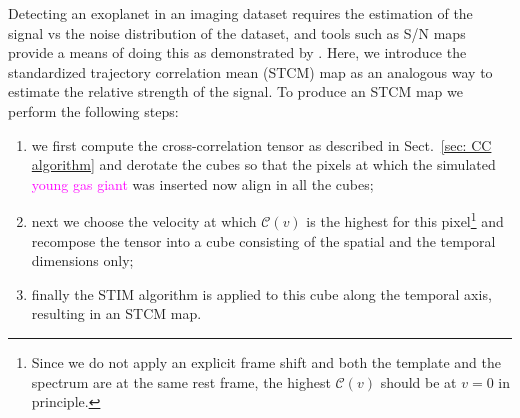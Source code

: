 \documentclass[referee]{aa} %
\newcommand{\newchange}[1]{\textcolor{magenta}{#1}}
\begin{document}
Detecting an exoplanet in an imaging dataset requires the estimation of the signal vs the noise distribution of the dataset, and tools such as S/N maps provide a means of doing this as demonstrated by \citet{2014MawetSNR}.
Here, we introduce the standardized trajectory correlation mean (STCM) map as an analogous way to estimate the relative strength of the signal. To produce an STCM map we perform the following steps:
\begin{enumerate}
    \item we first compute the cross-correlation tensor as described in Sect.~\ref{sec: CC algorithm} and derotate the cubes so that the pixels at which the simulated \newchange{young gas giant} was inserted now align in all the cubes;
    \item next we choose the velocity at which $\mathcal{C}(v)$ is the highest for this pixel\footnote{Since we do not apply an explicit frame shift and both the template and the spectrum are at the same rest frame, the highest $\mathcal{C}(v)$ should be at $v=0$ in principle.} and recompose the tensor into a cube consisting of the spatial and the temporal dimensions only;
    \item finally the STIM algorithm is applied to this cube along the temporal axis, resulting in an STCM map.
\end{enumerate}
\end{document}

